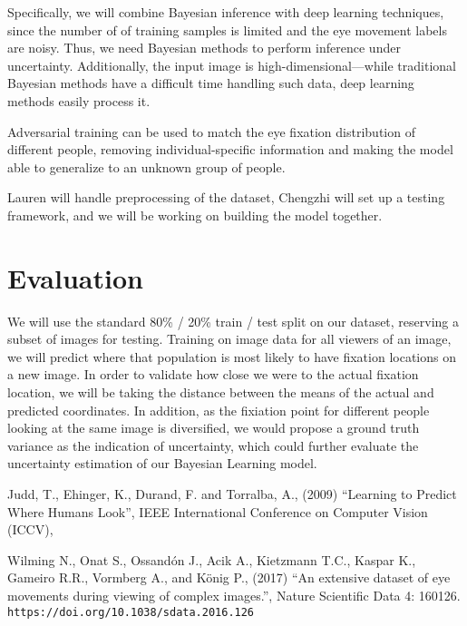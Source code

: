 \documentclass[11pt]{article}
\begin{document}
Specifically, we will combine Bayesian inference with deep learning techniques,
since the number of of training samples is limited and the eye movement labels
are noisy. Thus, we need Bayesian methods to perform inference under
uncertainty. Additionally, the input image is high-dimensional---while
traditional Bayesian methods have a difficult time handling such data, deep
learning methods easily process it.

Adversarial training can be used to match the eye fixation distribution of
different people, removing individual-specific information and making the model
able to generalize to an unknown group of people.

Lauren will handle preprocessing of the dataset, Chengzhi will set up a testing
framework, and we will be working on building the model together. 
\vspace{-0.5cm}

\section{Evaluation}

We will use the standard 80\% / 20\% train / test split on our dataset,
reserving a subset of images for testing. Training on image data for all
viewers of an image, we will predict where that population is most likely to
have fixation locations on a new image. In order to validate how close we were
to the actual fixation location, we will be taking the distance between the
means of the actual and predicted coordinates. In addition, as the fixiation
point for different people looking at the same image is diversified, we would
propose a ground truth variance as the indication of uncertainty, which could
further evaluate the uncertainty estimation of our Bayesian Learning model.



\vspace{-0.25cm}


\begin{thebibliography}{99}
      Judd, T., Ehinger, K., Durand, F. and Torralba, A.,
      (2009)
      ``Learning to Predict Where Humans Look'',
      IEEE International Conference on Computer Vision (ICCV),

     Wilming N., Onat S., Ossandón J., Acik A., Kietzmann
    T.C., Kaspar K., Gameiro R.R., Vormberg A., and König P., (2017)
    ``An extensive dataset of eye movements during viewing of complex
    images.'', Nature Scientific Data 4: 160126.  \verb|https://doi.org/10.1038/sdata.2016.126|

\end{thebibliography}
\end{document}
